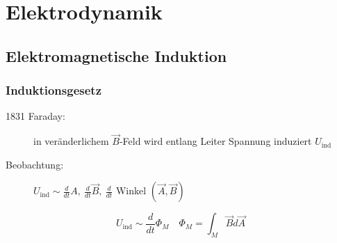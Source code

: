 \documentclass[titlepage,12pt,a4paper,ngerman]{report}
\newcommand{\tx}[1]{\textrm{#1}}
\newcommand{\uind}{U_{\tx{ind}}}
\begin{document}
\chapter{Elektrodynamik}
\setcounter{section}{9}
\section{Elektromagnetische Induktion}
\subsection{Induktionsgesetz}
\begin{description}
	\item [1831 Faraday:] in veränderlichem $\vec{B}$-Feld wird entlang Leiter Spannung induziert $\uind$
	\item [Beobachtung:] $\uind \sim \frac{d}{dt}A,\ \frac{d}{dt} \vec{B},\ \frac{d}{dt}$ Winkel $(\vec{A},\vec{B})$
\end{description}
$$ \uind \sim \frac{d}{dt} \Phi_{M} \quad \Phi_{M} = \int_M \vec{B} d \vec{A} $$
\end{document}
